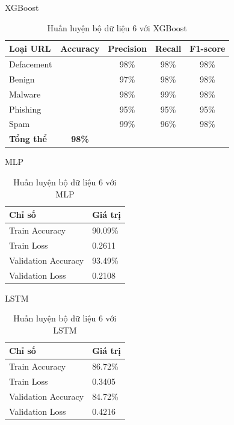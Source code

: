 \documentclass[13pt]{article}
\begin{document}
XGBoost
\begin{table}[h]
    \centering
    \renewcommand{\arraystretch}{1.3} %
    \begin{tabular}{|l|c|c|c|c|}
        \hline
        \rowcolor[HTML]{C0C0C0} %
        \textbf{Loại URL} & \textbf{Accuracy} & \textbf{Precision} & \textbf{Recall} & \textbf{F1-score} \\ 
        \hline
        Defacement &  & 98\% & 98\% & 98\% \\ 
        \hline
        Benign &  & 97\% & 98\% & 98\% \\ 
        \hline
        Malware &  & 98\% & 99\% & 98\% \\ 
        \hline
        Phishing &  & 95\% & 95\% & 95\% \\ 
        \hline
        Spam &  & 99\% & 96\% & 98\% \\ 
        \hline
        \textbf{Tổng thể} & \textbf{98\%} &  &  &  \\ 
        \hline
    \end{tabular}
    \caption{Huấn luyện bộ dữ liệu 6 với XGBoost}
    \label{tab:logistic_regression}
\end{table}

MLP
\newpage
\begin{table}[h]
    \centering
    \renewcommand{\arraystretch}{1.4} %
    \begin{tabular}{|p{5cm}|p{3cm}|}
        \hline
        \rowcolor[HTML]{C0C0C0} %
        \textbf{Chỉ số} & \textbf{Giá trị} \\ 
        \hline
        Train Accuracy & 90.09\% \\ 
        \hline
        Train Loss & 0.2611 \\ 
        \hline
        Validation Accuracy & 93.49\% \\ 
        \hline
        Validation Loss & 0.2108 \\ 
        \hline
    \end{tabular}
    \caption{Huấn luyện bộ dữ liệu 6 với MLP}
    \label{tab:mlp_training}
\end{table}

LSTM
\begin{table}[h]
    \centering
    \renewcommand{\arraystretch}{1.4} %
    \begin{tabular}{|p{5cm}|p{3cm}|}
        \hline
        \rowcolor[HTML]{C0C0C0} %
        \textbf{Chỉ số} & \textbf{Giá trị} \\ 
        \hline
        Train Accuracy & 86.72\% \\ 
        \hline
        Train Loss & 0.3405 \\ 
        \hline
        Validation Accuracy & 84.72\% \\ 
        \hline
        Validation Loss & 0.4216 \\ 
        \hline
    \end{tabular}
    \caption{Huấn luyện bộ dữ liệu 6 với LSTM}
    \label{tab:mlp_training}
\end{table}
\end{document}
